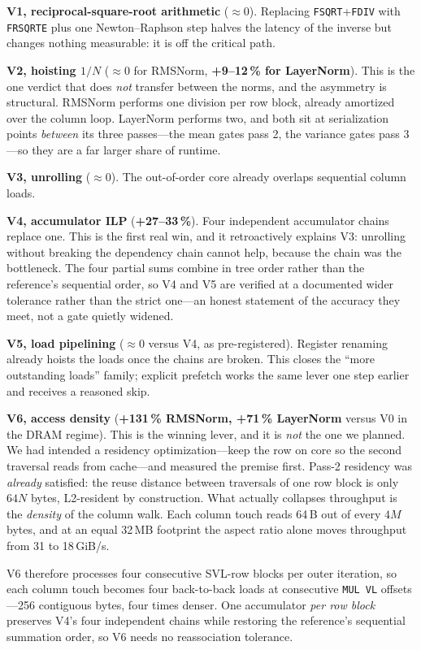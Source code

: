 \documentclass[conference,10pt]{IEEEtran}
\newcommand{\code}[1]{\texttt{\small #1}}
\begin{document}
\textbf{V1, reciprocal-square-root arithmetic} ($\approx$0). Replacing
\code{FSQRT}+\code{FDIV} with \code{FRSQRTE} plus one Newton--Raphson step
halves the latency of the inverse but changes nothing measurable: it is off the
critical path.

\textbf{V2, hoisting $1/N$} ($\approx$0 for RMSNorm, \textbf{+9--12\,\% for
LayerNorm}). This is the one verdict that does \emph{not} transfer between the
norms, and the asymmetry is structural. RMSNorm performs one division per row
block, already amortized over the column loop. LayerNorm performs two, and both
sit at serialization points \emph{between} its three passes---the mean gates
pass 2, the variance gates pass 3---so they are a far larger share of runtime.

\textbf{V3, unrolling} ($\approx$0). The out-of-order core already overlaps
sequential column loads.

\textbf{V4, accumulator ILP} (\textbf{+27--33\,\%}). Four independent
accumulator chains replace one. This is the first real win, and it retroactively
explains V3: unrolling without breaking the dependency chain cannot help,
because the chain was the bottleneck. The four partial sums combine in tree
order rather than the reference's sequential order, so V4 and V5 are verified at
a documented wider tolerance rather than the strict one---an honest statement of
the accuracy they meet, not a gate quietly widened.

\textbf{V5, load pipelining} ($\approx$0 versus V4, as pre-registered). Register
renaming already hoists the loads once the chains are broken. This closes the
``more outstanding loads'' family; explicit prefetch works the same lever one
step earlier and receives a reasoned skip.

\textbf{V6, access density} (\textbf{+131\,\% RMSNorm, +71\,\% LayerNorm} versus
V0 in the DRAM regime). This is the winning lever, and it is \emph{not} the one
we planned. We had intended a residency optimization---keep the row on core so
the second traversal reads from cache---and measured the premise first. Pass-2
residency was \emph{already} satisfied: the reuse distance between traversals of
one row block is only $64N$ bytes, L2-resident by construction. What actually
collapses throughput is the \emph{density} of the column walk. Each column touch
reads 64\,B out of every $4M$ bytes, and at an equal 32\,MB footprint the aspect
ratio alone moves throughput from 31 to 18\,GiB/s.

V6 therefore processes four consecutive SVL-row blocks per outer iteration, so
each column touch becomes four back-to-back loads at consecutive
\code{MUL VL} offsets---256 contiguous bytes, four times denser. One accumulator
\emph{per row block} preserves V4's four independent chains while restoring the
reference's sequential summation order, so V6 needs no reassociation tolerance.
\end{document}

